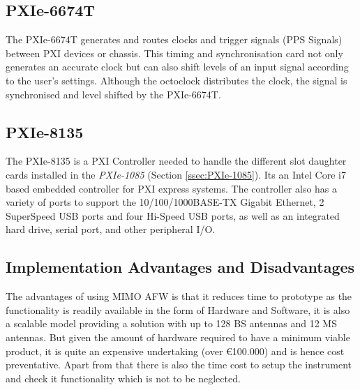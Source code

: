 \subsection{PXIe-6674T}\label{ssec:PXIe-6674T}
The PXIe-6674T generates and routes clocks and trigger signals (PPS Signals) between PXI devices or chassis. This timing and synchronisation card not only generates an accurate clock but can also shift levels of an input signal according to the user's settings. Although the octoclock distributes the clock, the signal is synchronised and level shifted by the PXIe-6674T.

\subsection{PXIe-8135}\label{ssec:PXIe-8135}
The PXIe-8135 is a PXI Controller needed to handle the different slot daughter cards installed in the \emph{PXIe-1085} (Section \ref{ssec:PXIe-1085}). Its an Intel Core i7 based embedded controller for PXI express systems. The controller also has a variety of ports to support the 10/100/1000BASE-TX Gigabit Ethernet, 2 SuperSpeed USB ports and four Hi-Speed USB ports, as well as an integrated hard drive, serial port, and other peripheral I/O.

\subsection{Implementation Advantages and Disadvantages}\label{ssec:MIMOAFWADVDISADV}
The advantages of using MIMO AFW is that it reduces time to prototype as the functionality is readily available in the form of Hardware and Software, it is also a scalable model providing a solution with up to 128 BS antennas and 12 MS antennas. But given the amount of hardware required to have a minimum viable product, it is quite an expensive undertaking (over €100.000) and is hence cost preventative. Apart from that there is also the time cost to setup the instrument and check it functionality which is not to be neglected.

